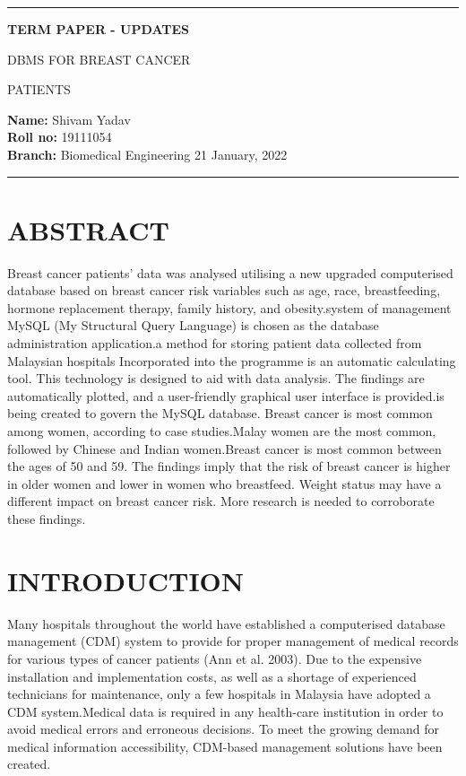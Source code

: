 \documentclass[10pt,a4paper,twoside]{article}
\begin{document}
\begin{center}
\hrule

\vspace{.4cm}
{\bf {\Large TERM PAPER - UPDATES }}\\
\vspace{0.3cm}
{\bf {\huge DBMS FOR BREAST CANCER 


PATIENTS}}
\vspace{0.3cm}
\end{center}
{\bf Name:}  Shivam Yadav\\
{\bf Roll no:}  19111054 \\
{\bf Branch: }  Biomedical Engineering \hspace{\fill}  21 January, 2022 \\
\hrule

\vspace{.5cm}

\section{ABSTRACT}

Breast cancer patients' data was analysed utilising a new upgraded computerised database based on breast cancer risk variables such as age, race, breastfeeding, hormone replacement therapy, family history, and obesity.system of management MySQL (My Structural Query Language) is chosen as the database administration application.a method for storing patient data collected from Malaysian hospitals Incorporated into the programme is an automatic calculating tool.
This technology is designed to aid with data analysis. The findings are automatically plotted, and a user-friendly graphical user interface is provided.is being created to govern the MySQL database. Breast cancer is most common among women, according to case studies.Malay women are the most common, followed by Chinese and Indian women.Breast cancer is most common between the ages of 50 and 59.
The findings imply that the risk of breast cancer is higher in older women and lower in women who breastfeed. Weight status may have a different impact on breast cancer risk. More research is needed to corroborate these findings.

\section{ INTRODUCTION}

Many hospitals throughout the world have established a computerised database management (CDM) system to provide for proper management of medical records for various types of cancer patients (Ann et al. 2003). Due to the expensive installation and implementation costs, as well as a shortage of experienced technicians for maintenance, only a few hospitals in Malaysia have adopted a CDM system.Medical data is required in any health-care institution in order to avoid medical errors and erroneous decisions. To meet the growing demand for medical information accessibility, CDM-based management solutions have been created.
\vspace{0.3cm}
\end{document}
